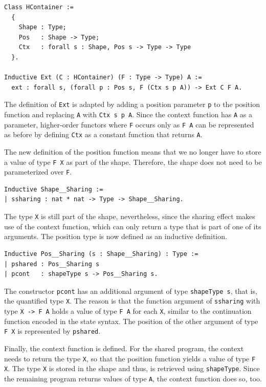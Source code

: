 \documentclass[a4paper, 11pt, fleqn, twoside, abstract=on]{scrreprt}
\newcommand{\hinl}[1]{\texttt{#1}}
\newcommand{\cinl}[1]{\texttt{#1}}
\begin{document}
\begin{verbatim}
Class HContainer :=
  {
    Shape : Type;
    Pos   : Shape -> Type;
    Ctx   : forall s : Shape, Pos s -> Type -> Type
  }.

Inductive Ext (C : HContainer) (F : Type -> Type) A :=
  ext : forall s, (forall p : Pos s, F (Ctx s p A)) -> Ext C F A.
\end{verbatim}

The definition of \cinl{Ext} is adapted by adding a position parameter \cinl{p} to the position function and replacing \cinl{A} with \cinl{Ctx s p A}.
Since the context function has \cinl{A} as a parameter, higher-order functors where \hinl{F} occurs only as \hinl{F A} can be represented as before by defining \cinl{Ctx} as a constant function that returns \cinl{A}.

The new definition of the position function means that we no longer have to store a value of type \cinl{F X} as part of the shape.
Therefore, the shape does not need to be parameterized over \cinl{F}.

\begin{verbatim}
Inductive Shape__Sharing :=
| ssharing : nat * nat -> Type -> Shape__Sharing.
\end{verbatim}
\noindent
The type \cinl{X} is still part of the shape, nevertheless, since the sharing effect makes use of the context function, which can only return a type that is part of one of its arguments.
The position type is now defined as an inductive definition.

\begin{verbatim}
Inductive Pos__Sharing (s : Shape__Sharing) : Type :=
| pshared : Pos__Sharing s
| pcont   : shapeType s -> Pos__Sharing s.
\end{verbatim}
\noindent
The constructor \cinl{pcont} has an additional argument of type \cinl{shapeType s}, that is, the quantified type \cinl{X}.
The reason is that the function argument of \cinl{ssharing} with type \cinl{X -> F A} holds a value of type \cinl{F A} for each \cinl{X}, similar to the continuation function encoded in the state syntax.
The position of the other argument of type \cinl{F X} is represented by \cinl{pshared}.



Finally, the context function is defined.
For the shared program, the context needs to return the type \cinl{X}, so that the position function yields a value of type \cinl{F X}.
The type \cinl{X} is stored in the shape and thus, is retrieved using \cinl{shapeType}.
Since the remaining program returns values of type \cinl{A}, the context function does so, too.
\end{document}
